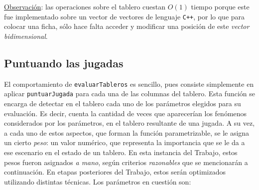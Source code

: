 \documentclass[12pt,a4paper]{article}
\begin{document}
    \underline{Observación}: las operaciones sobre el tablero cuestan $O(1)$ tiempo porque este fue implementado sobre un vector de vectores de lenguaje \texttt{C++}, por lo que para colocar una ficha, sólo hace falta acceder y modificar una posición de este \textit{vector bidimensional}. \\[2pt]
    
    
    
    \subsection{Puntuando las jugadas}
    
    El comportamiento de \texttt{evaluarTableros} es sencillo, pues consiste simplemente en aplicar \texttt{puntuarJugada} para cada una de las columnas del tablero. Esta función se encarga de detectar en el tablero cada uno de los parámetros elegidos para su evaluación. Es decir, cuenta la cantidad de veces que aparecerían los fenómenos considerados por los parámetros, en el tablero resultante de una jugada. A su vez, a cada uno de estos aspectos, que forman la función parametrizable, se le asigna un cierto \textit{peso}: un valor numérico, que representa la importancia que se le da a ese escenario en el estado de un tablero. En esta instancia del Trabajo, estos pesos fueron asignados \textit{a mano}, según criterios \textit{razonables} que se mencionarán a continuación. En etapas posteriores del Trabajo, estos serán optimizados utilizando distintas técnicas. Los parámetros en cuestión son:
    
    
\end{document}
